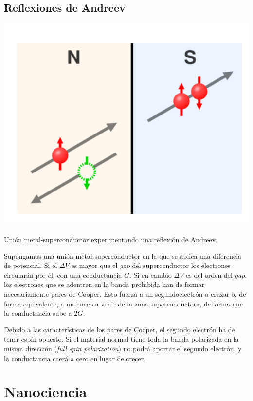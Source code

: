 \documentclass{tufte-book}
\begin{document}
\section{Reflexiones de Andreev}

\begin{marginfigure}
  \centering
  \includegraphics[width=\textwidth]{figures/andreev.png}
  \caption{Unión metal-superconductor experimentando una reflexión de Andreev.}
  \label{fig:andreev}
\end{marginfigure}

Supongamos una unión metal-superconductor en la que se aplica una
diferencia de potencial. Si el $ΔV$ es mayor que el \textit{gap} del
superconductor los electrones circularán por él, con una conductancia
$G$. Si en cambio $ΔV$ es del orden del \textit{gap}, los electrones
que se adentren en la banda prohibida han de formar necesariamente
pares de Cooper. Esto fuerza a un segundo\footnotemark electrón a
cruzar o, de forma equivalente, a un hueco a venir de la zona
superconductora, de forma que la conductancia sube a $2G$.

Debido a las características de los pares de Cooper, el segundo
electrón ha de tener espín opuesto. Si el material normal tiene toda
la banda polarizada en la misma dirección (\emph{full spin
  polarization}) no podrá aportar el segundo electrón, y la
conductancia caerá a cero en lugar de crecer.

\chapter{Nanociencia}
\end{document}
